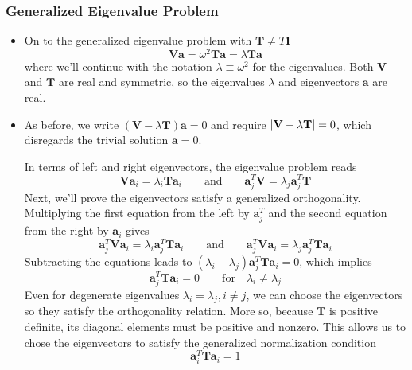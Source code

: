 \documentclass[11pt, a4paper]{article}
\newcommand{\eqtext}[1]{\qquad \text{#1} \qquad}
\newcommand{\mat}[1]{\mathbf{#1}} %
\begin{document}
\subsubsection{Generalized Eigenvalue Problem}
\begin{itemize}
	\item On to the generalized eigenvalue problem with $ \mat{T} \neq T \mat{I} $
	\begin{equation*}
		\mat{V}\bm{a} = \omega^{2} \mat{T} \bm{a} = \lambda \mat{T} \bm{a}
	\end{equation*}
	where we'll continue with the notation $ \lambda \equiv \omega^{2} $ for the eigenvalues. Both $ \mat{V} $ and $ \mat{T} $ are real and symmetric, so the eigenvalues $ \lambda $ and eigenvectors $ \bm{a} $ are real. 
	
	\item As before, we write $ (\mat{V} - \lambda \mat{T}) \bm{a} = 0$ and require $ \abs{\mat{V} - \lambda \mat{T}} = 0 $, which disregards the trivial solution $ \bm{a} = 0$. 
	
	In terms of left and right eigenvectors, the eigenvalue problem reads
	\begin{equation*}
		\mat{V}\bm{a}_{i} = \lambda_{i} \mat{T} \bm{a}_{i} \eqtext{and} \mat{a}_{j}^{T}  \mat{V} = \lambda_{j} \mat{a}_{j}^{T} \mat{T} 
	\end{equation*}
	Next, we'll prove the eigenvectors satisfy a generalized orthogonality. Multiplying the first equation from the left by $ \bm{a}_{j}^{T} $ and the second equation from the right by $ \bm{a}_{i} $ gives
	\begin{equation*}
		\mat{a}_{j}^{T} \mat{V}\bm{a}_{i} = \lambda_{i} \mat{a}_{j}^{T}  \mat{T} \bm{a}_{i} \eqtext{and} \mat{a}_{j}^{T}  \mat{V}\bm{a}_{i} = \lambda_{j} \mat{a}_{j}^{T} \mat{T} \bm{a}_{i}
	\end{equation*}
	Subtracting the equations leads to $ (\lambda_{i} - \lambda_{j}) \mat{a}_{j}^{T} \mat{T} \bm{a}_{i} = 0 $, which implies 
	\begin{equation*}
		\mat{a}_{j}^{T} \mat{T} \bm{a}_{i} = 0  \qquad \text{for} \quad \lambda_{i} \neq \lambda_{j}
	\end{equation*}
	Even for degenerate eigenvalues $ \lambda_{i} = \lambda_{j}, i \neq j $, we can choose the eigenvectors so they satisfy the orthogonality relation.  More so, because $ \mat{T} $ is positive definite, its diagonal elements must be positive and nonzero. This allows us to chose the eigenvectors to satisfy the generalized normalization condition
	\begin{equation*}
		\bm{a}_{i}^{T} \mat{T} \bm{a}_{i} = 1
	\end{equation*}
	

\end{itemize}
\end{document}

